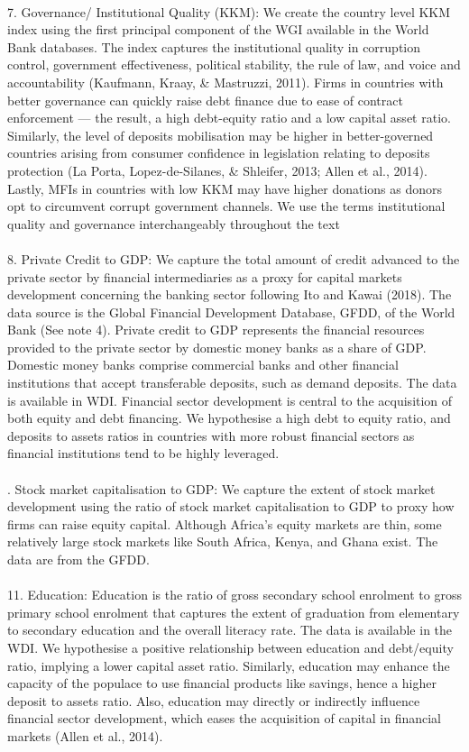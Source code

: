 \documentclass[a4paper, nobind]{templates/ociamthesis}
\begin{document}
\begin{longtabu}
\addlinespace
\\
7. Governance/ Institutional Quality (KKM): We create the country level KKM index using the first principal component of the WGI available in the World Bank databases. The index captures the institutional quality in corruption control, government effectiveness, political stability, the rule of law, and voice and accountability (Kaufmann, Kraay, \& Mastruzzi, 2011). Firms in countries with better governance can quickly raise debt finance due to ease of contract enforcement — the result, a high debt-equity ratio and a low capital asset ratio. Similarly, the level of deposits mobilisation may be higher in better-governed countries arising from consumer confidence in legislation relating to deposits protection (La Porta, Lopez-de-Silanes, \& Shleifer, 2013; Allen et al., 2014). Lastly, MFIs in countries with low KKM may have higher donations as donors opt to circumvent corrupt government channels. We use the terms institutional quality and governance interchangeably throughout the text\\
\\
8. Private Credit to GDP: We capture the total amount of credit advanced to the private sector by financial intermediaries as a proxy for capital markets development concerning the banking sector following Ito and Kawai (2018). The data source is the Global Financial Development Database, GFDD, of the World Bank (See note 4). Private credit to GDP represents the financial resources provided to the private sector by domestic money banks as a share of GDP. Domestic money banks comprise commercial banks and other financial institutions that accept transferable deposits, such as demand deposits. The data is available in WDI. Financial sector development is central to the acquisition of both equity and debt financing. We hypothesise a high debt to equity ratio, and deposits to assets ratios in countries with more robust financial sectors as financial institutions tend to be highly leveraged.\\
\\
. Stock market capitalisation to GDP: We capture the extent of stock market development using the ratio of stock market capitalisation to GDP to proxy how firms can raise equity capital. Although Africa's equity markets are thin, some relatively large stock markets like South Africa, Kenya, and Ghana exist. The data are from the GFDD.\\
\\
11. Education: Education is the ratio of gross secondary school enrolment to gross primary school enrolment that captures the extent of graduation from elementary to secondary education and the overall literacy rate. The data is available in the WDI. We hypothesise a positive relationship between education and debt/equity ratio, implying a lower capital asset ratio. Similarly, education may enhance the capacity of the populace to use financial products like savings, hence a higher deposit to assets ratio.  Also, education may directly or indirectly influence financial sector development, which eases the acquisition of capital in financial markets (Allen et al., 2014).\\

\end{longtabu}
\end{document}
